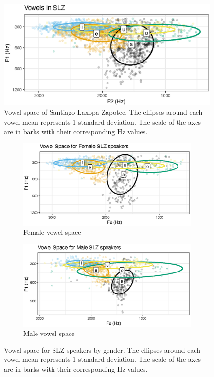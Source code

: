 \begin{figure}[h!]
    \centering
    \includegraphics[width = 0.9\linewidth]{images/slz_vowels.eps}
    \caption{Vowel space of Santiago Laxopa Zapotec. The ellipses around each vowel mean represents 1 standard deviation. The scale of the axes are in barks with their corresponding Hz values.}
    \label{fig:SLZvowels}
\end{figure}

\begin{figure}[h!]
	\centering
	\begin{subfigure}{.5\textwidth}
		\centering
		\includegraphics[width=\linewidth]{Images/slz_vowels_f.eps}
		\caption{Female vowel space}
		\label{fig:slz_vowels_f}
	\end{subfigure}%
	\begin{subfigure}{.5\textwidth}
		\centering
		\includegraphics[width=\linewidth]{Images/slz_vowels_m.eps}
		\caption{Male vowel space}
		\label{fig:slz_vowels_m}
	\end{subfigure}	
	\caption{Vowel space for SLZ speakers by gender. The ellipses around each vowel mean represents 1 standard deviation. The scale of the axes are in barks with their corresponding Hz values.}
	\label{fig:slz_vowels}
\end{figure}

